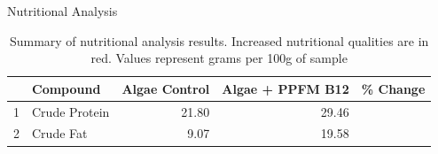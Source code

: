\documentclass[8pt]{beamer}\usepackage[]{graphicx}\usepackage[]{color}
\begin{document}
\begin{frame}{Nutritional Analysis}


\begin{table}[ht]
\centering
\begin{tabular}{rlrrl}
  \hline
 & Compound & Algae Control & Algae + PPFM B12 & \% Change \\ 
  \hline
1 & Crude Protein & 21.80 & 29.46 & \textbf{\color{red}{35.14}} \\ 
  2 & Crude Fat & 9.07 & 19.58 & \textbf{\color{red}{115.88}} \\ 
   \hline
\end{tabular}
\caption{Summary of nutritional analysis results. Increased nutritional qualities are in red. Values represent grams per 100g of sample} 
\label{tab:MiscTable}
\end{table}


\end{frame}
%
\end{document}
